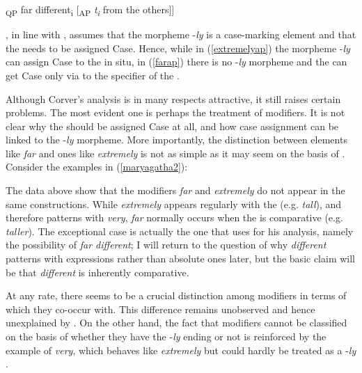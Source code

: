 \ea {[}\textsubscript{QP} far different\textsubscript{i} [\textsubscript{AP} \emph{t\textsubscript{i}} from the others]] \label{farap}
\z

\citet[160]{corver1997}, in line with \citet{larson1987}, assumes that the morpheme -\textit{ly} is a case-marking element and that the  needs to be assigned Case. Hence, while in (\ref{extremelyap}) the morpheme -\textit{ly} can assign Case to the  in situ, in (\ref{farap}) there is no -\textit{ly} morpheme and the  can get Case only via  to the specifier of the .

Although Corver's analysis is in many respects attractive, it still raises certain problems. The most evident one is perhaps the treatment of modifiers. It is not clear why the  should be assigned Case at all, and how case assignment can be linked to the -\textit{ly} morpheme. More importantly, the distinction between elements like \textit{far} and ones like \textit{extremely} is not as simple as it may seem on the basis of \citet{corver1997}. Consider the examples in (\ref{maryagatha2}):

\ea \label{maryagatha2}
 \label{fartaller}
\z
\z

The data above show that the modifiers \textit{far} and \textit{extremely} do not appear in the same constructions. While \textit{extremely} appears regularly with the  (e.g. \textit{tall}), and therefore patterns with \textit{very}, \textit{far} normally occurs when the  is comparative (e.g. \textit{taller}). The exceptional case is actually the one that \citet{corver1997} uses for his analysis, namely the possibility of \textit{far different}; I will return to the question of why \textit{different} patterns with  expressions rather than absolute ones later, but the basic claim will be that \textit{different} is inherently comparative.

At any rate, there seems to be a crucial distinction among modifiers in terms of which  they co-occur with. This difference remains unobserved and hence unexplained by \citet{corver1997}. On the other hand, the fact that modifiers cannot be classified on the basis of whether they have the -\textit{ly} ending or not is reinforced by the example of \textit{very}, which behaves like \textit{extremely} but could hardly be treated as a -\textit{ly} .

